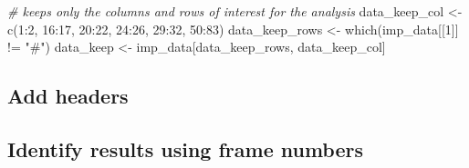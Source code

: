 \documentclass[
]{article}
\newenvironment{Shaded}{\begin{snugshade}}{\end{snugshade}}
\newcommand{\CommentTok}[1]{\textcolor[rgb]{0.56,0.35,0.01}{\textit{#1}}}
\newcommand{\DecValTok}[1]{\textcolor[rgb]{0.00,0.00,0.81}{#1}}
\newcommand{\FunctionTok}[1]{\textcolor[rgb]{0.00,0.00,0.00}{#1}}
\newcommand{\NormalTok}[1]{#1}
\newcommand{\OtherTok}[1]{\textcolor[rgb]{0.56,0.35,0.01}{#1}}
\newcommand{\SpecialCharTok}[1]{\textcolor[rgb]{0.00,0.00,0.00}{#1}}
\newcommand{\StringTok}[1]{\textcolor[rgb]{0.31,0.60,0.02}{#1}}
\begin{document}
\begin{Shaded}
\begin{Highlighting}[]
\CommentTok{\# keeps only the columns and rows of interest for the analysis }
\NormalTok{data\_keep\_col }\OtherTok{\textless{}{-}} \FunctionTok{c}\NormalTok{(}\DecValTok{1}\SpecialCharTok{:}\DecValTok{2}\NormalTok{, }\DecValTok{16}\SpecialCharTok{:}\DecValTok{17}\NormalTok{, }\DecValTok{20}\SpecialCharTok{:}\DecValTok{22}\NormalTok{, }\DecValTok{24}\SpecialCharTok{:}\DecValTok{26}\NormalTok{, }\DecValTok{29}\SpecialCharTok{:}\DecValTok{32}\NormalTok{, }\DecValTok{50}\SpecialCharTok{:}\DecValTok{83}\NormalTok{)}
\NormalTok{data\_keep\_rows }\OtherTok{\textless{}{-}} \FunctionTok{which}\NormalTok{(imp\_data[[}\DecValTok{1}\NormalTok{]] }\SpecialCharTok{!=} \StringTok{"\#"}\NormalTok{)}
\NormalTok{data\_keep }\OtherTok{\textless{}{-}}\NormalTok{ imp\_data[data\_keep\_rows, data\_keep\_col]}
\end{Highlighting}
\end{Shaded}

\hypertarget{add-headers}{%
\subsection{Add headers}\label{add-headers}}

\begin{Shaded}
\end{Shaded}

\hypertarget{identify-results-using-frame-numbers}{%
\subsection{Identify results using frame
numbers}\label{identify-results-using-frame-numbers}}
\end{document}
